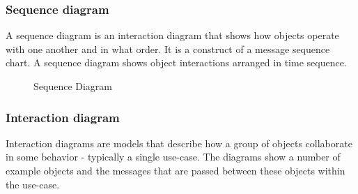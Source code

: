 \documentclass[12pt,a4paper]{report}
\begin{document}
\subsubsection{Sequence diagram}
A sequence diagram is an interaction diagram that shows how objects operate with one another and in what order. It is a construct of a message sequence chart. A sequence diagram shows object interactions arranged in time sequence.\\

\begin{figure}[h]
	\begin{center}
		\caption{Sequence Diagram}
	\end{center}
\end{figure}
\newpage
\subsubsection{Interaction diagram}
Interaction diagrams are models that describe how a group of objects collaborate in some behavior - typically a single use-case. The diagrams show a number of example objects and the messages that are passed between these objects within the use-case.\\
\end{document}
